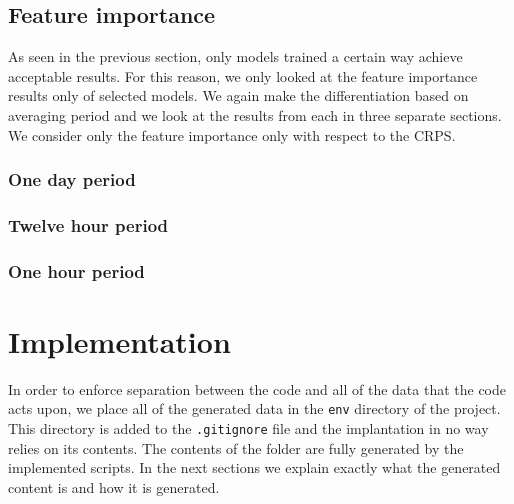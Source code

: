 \documentclass[12pt,a4paper,twoside]{scrartcl}
\numberwithin{equation}{section}
\begin{document}

\subsection{Feature importance}\label{sec:model-feature-imp}
As seen in the previous section, only models trained a certain way achieve acceptable results. For this reason, we only looked at the feature importance results only of selected models. We again make the differentiation based on averaging period and we look at the results from each in three separate sections. We consider only the feature importance only with respect to the CRPS.

\subsubsection{One day period}


\subsubsection{Twelve hour period}

\subsubsection{One hour period}
\section{Implementation}\label{sec:impl}
In order to enforce separation between the code and all of the data that the code acts upon, we place all of the generated data in the \texttt{env} directory of the project. This directory is added to the \texttt{.gitignore} file and the implantation in no way relies on its contents. The contents of the folder are fully generated by the implemented scripts. In the next sections we explain exactly what the generated content is and how it is generated.
\end{document}
